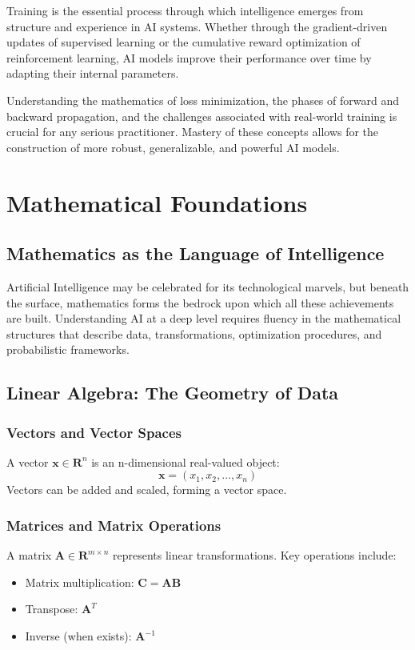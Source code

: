 \documentclass[openany]{book}
\begin{document}
Training is the essential process through which intelligence emerges from 
structure and experience in AI systems. Whether through the gradient-driven 
updates of supervised learning or the cumulative reward optimization of 
reinforcement learning, AI models improve their performance over time by 
adapting their internal parameters.

Understanding the mathematics of loss minimization, the phases of forward and 
backward propagation, and the challenges associated with real-world training is 
crucial for any serious practitioner. Mastery of these concepts allows for the 
construction of more robust, generalizable, and powerful AI models.

\chapter{Mathematical Foundations}

\section{Mathematics as the Language of Intelligence}

Artificial Intelligence may be celebrated for its technological marvels, but 
beneath the surface, mathematics forms the bedrock upon which all these 
achievements are built. Understanding AI at a deep level requires fluency in the 
mathematical structures that describe data, transformations, optimization 
procedures, and probabilistic frameworks.

\section{Linear Algebra: The Geometry of Data}

\subsection{Vectors and Vector Spaces}
A vector $\mathbf{x} \in \mathbf{R}^n$ is an n-dimensional real-valued object:
\[
\mathbf{x} = (x_1, x_2, \ldots, x_n)
\]
Vectors can be added and scaled, forming a vector space.

\subsection{Matrices and Matrix Operations}
A matrix $\mathbf{A} \in \mathbf{R}^{m \times n}$ represents linear 
transformations. Key operations include:
\begin{itemize}
    \item Matrix multiplication: $\mathbf{C} = \mathbf{AB}$
    \item Transpose: $\mathbf{A}^T$
    \item Inverse (when exists): $\mathbf{A}^{-1}$
\end{itemize}
\end{document}
